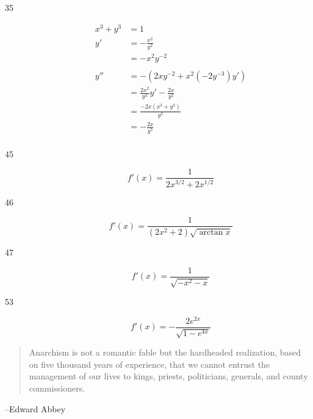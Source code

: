 \documentclass[letterpaper, landscape]{exam}
\begin{document}
\begin{description}
    \item[35] 
      \begin{align*}
        x^3 + y^3 & = 1 \\
        y'        & = - \frac{x^2}{y^2} \\
                  & = -x^2y^{-2} \\
        \\
        y''       & = - \left( 2xy^{-2} + x^2 \left( -2y^{-3} \right) y' \right) \\
                  & = \frac{2x^2}{y^3} y' - \frac{2x}{y^2} \\
                  & = \frac{-2x \left( x^3 + y^3 \right)}{y^3} \\
                  & = \boxed{ - \frac{2x}{y^5} } \\
      \end{align*}

    \item[45] 
      \[
        f'(x) = \frac{1}{2 x^{3/2} + 2 x^{1/2}}
      \]

    \item[46] 
      \[
        f'(x) = \frac{1}{\left( 2x^2 + 2 \right) \sqrt{\arctan x}}
      \]

    \item[47] 
      \[
        f'(x) = \frac{1}{\sqrt{- x^2 - x}}
      \]

    \item[53] 
      \[
        f'(x) = - \frac{2 e^{2x}}{\sqrt{1 - e^{4x}}}
      \]

  \end{description}

  \else
    \vspace{10 cm}
    \begin{quote}
      \begin{em}
        Anarchism is not a romantic fable but the hardheaded realization, based
        on five thousand years of experience, that we cannot entrust the
        management of our lives to kings, priests, politicians, generals, and
        county commissioners.
      \end{em}
    \end{quote}
    \hspace{2 cm} --Edward Abbey
  \fi
\end{document}
